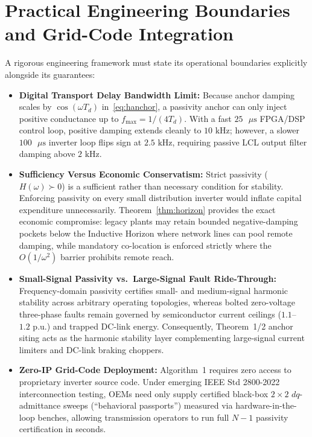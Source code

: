 \documentclass[10pt,twocolumn]{article}
\begin{document}
\section{Practical Engineering Boundaries and Grid-Code Integration}
A rigorous engineering framework must state its operational boundaries explicitly alongside its guarantees:
\begin{itemize}[leftmargin=*,itemsep=2pt,topsep=2pt]
    \item \textbf{Digital Transport Delay Bandwidth Limit:} Because anchor damping scales by $\cos(\omega T_d)$ in~\eqref{eq:hanchor}, a passivity anchor can only inject positive conductance up to $f_{\max}=1/(4T_d)$. With a fast $25\text{ }\mu\text{s}$ FPGA/DSP control loop, positive damping extends cleanly to $10\text{ kHz}$; however, a slower $100\text{ }\mu\text{s}$ inverter loop flips sign at $2.5\text{ kHz}$, requiring passive LCL output filter damping above $2\text{ kHz}$.
    \item \textbf{Sufficiency Versus Economic Conservatism:} Strict passivity ($H(\omega)\succ 0$) is a sufficient rather than necessary condition for stability. Enforcing passivity on every small distribution inverter would inflate capital expenditure unnecessarily. Theorem~\ref{thm:horizon} provides the exact economic compromise: legacy plants may retain bounded negative-damping pockets below the Inductive Horizon where network lines can pool remote damping, while mandatory co-location is enforced strictly where the $O(1/\omega^2)$ barrier prohibits remote reach.
    \item \textbf{Small-Signal Passivity vs.\ Large-Signal Fault Ride-Through:} Frequency-domain passivity certifies small- and medium-signal harmonic stability across arbitrary operating topologies, whereas bolted zero-voltage three-phase faults remain governed by semiconductor current ceilings ($1.1$--$1.2\text{ p.u.}$) and trapped DC-link energy. Consequently, Theorem~1/2 anchor siting acts as the harmonic stability layer complementing large-signal current limiters and DC-link braking choppers.
    \item \textbf{Zero-IP Grid-Code Deployment:} Algorithm~1 requires zero access to proprietary inverter source code. Under emerging IEEE Std 2800-2022~\cite{ieee2800} interconnection testing, OEMs need only supply certified black-box $2\times 2$ $dq$-admittance sweeps (``behavioral passports'') measured via hardware-in-the-loop benches, allowing transmission operators to run full $N-1$ passivity certification in seconds.
\end{itemize}
\end{document}
